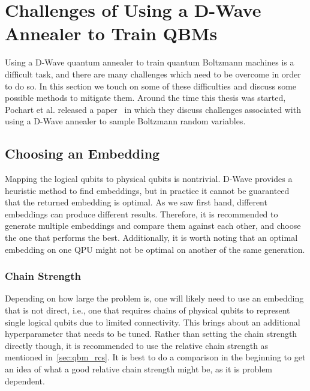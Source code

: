 \clearpage
\section{Challenges of Using a D-Wave Annealer to Train QBMs}\label{sec:challenges}
Using a D-Wave quantum annealer to train quantum Boltzmann machines is a difficult task, and there are many challenges which need to be overcome in order to do so.
In this section we touch on some of these difficulties and discuss some possible methods to mitigate them.
Around the time this thesis was started, Pochart et al. released a paper~\cite{pochart_2021} in which they discuss challenges associated with using a D-Wave annealer to sample Boltzmann random variables.

\subsection{Choosing an Embedding}
Mapping the logical qubits to physical qubits is nontrivial.
D-Wave provides a heuristic method to find embeddings, but in practice it cannot be guaranteed that the returned embedding is optimal.
As we saw first hand, different embeddings can produce different results.
Therefore, it is recommended to generate multiple embeddings and compare them against each other, and choose the one that performs the best.
Additionally, it is worth noting that an optimal embedding on one QPU might not be optimal on another of the same generation.

\subsubsection{Chain Strength}
Depending on how large the problem is, one will likely need to use an embedding that is not direct, i.e., one that requires chains of physical qubits to represent single logical qubits due to limited connectivity.
This brings about an additional hyperparameter that needs to be tuned.
Rather than setting the chain strength directly though, it is recommended to use the relative chain strength as mentioned in~\cref{sec:qbm_rcs}.
It is best to do a comparison in the beginning to get an idea of what a good relative chain strength might be, as it is problem dependent.

